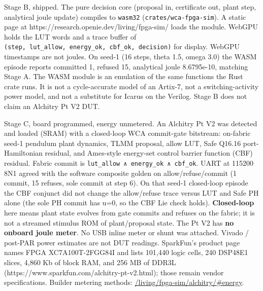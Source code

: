 \documentclass[
  10pt,
]{article}
\begin{document}
Stage B, shipped. The pure decision core (proposal in, certificate out,
plant step, analytical joule update) compiles to \texttt{wasm32}
(\texttt{crates/wca-fpga-sim}). A static page at
https://research.openie.dev/living/fpga-sim/ loads the module. WebGPU
holds the LUT words and a trace buffer of
\texttt{(step,\ lut\_allow,\ energy\_ok,\ cbf\_ok,\ decision)} for
display. WebGPU timestamps are not joules. On seed-1 (16 steps, theta
1.5, omega 3.0) the WASM episode reports committed 1, refused 15,
analytical joule 8.6795e-10, matching Stage A. The WASM module is an
emulation of the same functions the Rust crate runs. It is not a
cycle-accurate model of an Artix-7, not a switching-activity power
model, and not a substitute for Icarus on the Verilog. Stage B does not
claim an Alchitry Pt V2 DUT.

Stage C, board programmed, energy unmetered. An Alchitry Pt V2 was
detected and loaded (SRAM) with a closed-loop WCA commit-gate bitstream:
on-fabric seed-1 pendulum plant dynamics, TLMM proposal, allow LUT, Safe
Q16.16 port-Hamiltonian residual, and Ames-style energy-set control
barrier function (CBF) residual. Fabric commit is
\texttt{lut\_allow\ ∧\ energy\_ok\ ∧\ cbf\_ok}. UART at 115200 8N1
agreed with the software composite golden on allow/refuse/commit (1
commit, 15 refuses, sole commit at step 6). On that seed-1 closed-loop
episode the CBF conjunct did not change the allow/refuse trace versus
LUT and Safe PH alone (the sole PH commit has u=0, so the CBF Lie check
holds). \textbf{Closed-loop} here means plant state evolves from gate
commits and refuses on the fabric; it is not a streamed stimulus ROM of
plant/proposal state. The Pt V2 has \textbf{no onboard joule meter}. No
USB inline meter or shunt was attached. Vivado / post-PAR power
estimates are not DUT readings. SparkFun's product page names FPGA
XC7A100T-2FGG84I and lists 101,440 logic cells, 240 DSP48E1 slices,
4,860 Kb of block RAM, and 256 MB of DDR3L
(https://www.sparkfun.com/alchitry-pt-v2.html); those remain vendor
specifications. Builder metering methods:
\href{https://research.openie.dev/living/fpga-sim/alchitry/\#energy}{/living/fpga-sim/alchitry/\#energy}.
\end{document}
